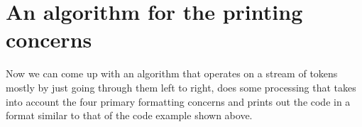 \section{An algorithm for the printing concerns}
Now we can come up with an algorithm that operates on a stream of tokens
mostly by just going through them left to right,
does some processing that takes into account the four primary formatting concerns and
prints out the code in a format similar to that of the code example shown above.








